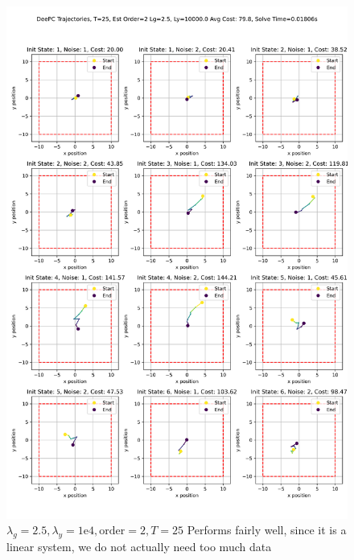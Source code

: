 \documentclass[11pt,a4paper]{article}
\begin{document}
\begin{figure}
    \centering
    \includegraphics[width=0.85\linewidth]{./figures/DeePC_trajectories_25_2_2.5_10000.0.png}
    \caption{$\lambda_g=2.5, \lambda_y=1\mathrm{e}4, \text{order}=2, T=25$ Performs fairly well, since it is a linear system, we do not actually need too much data}
    \label{fig:enter-label}
\end{figure}
\end{document}
